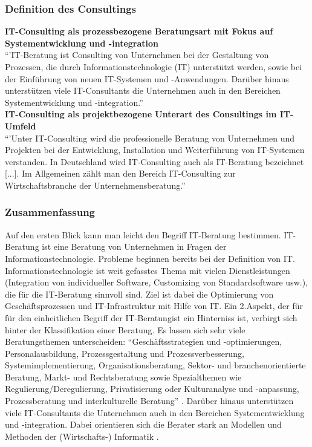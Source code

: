 		\subsubsection{Definition des Consultings}
		\textbf{IT-Consulting als prozessbezogene Beratungsart mit Fokus auf Systementwicklung und -integration}\\
			``'IT-Beratung ist Consulting von Unternehmen bei der Gestaltung von Prozessen, die durch Informationstechnologie (IT) unterstützt werden, sowie bei der Einführung von neuen IT-Systemen und -Anwendungen. Darüber hinaus unterstützen viele IT-Consultants die Unternehmen auch in den Bereichen Systementwicklung und -integration.'' \cite[208]{ReinekeBock200709}\\
			
		\textbf{ IT-Consulting als  projektbezogene Unterart des Consultings im IT-Umfeld}\\
			``'Unter IT-Consulting wird die professionelle Beratung von Unternehmen und Projekten bei der Entwicklung, Installation und Weiterführung von IT-Systemen verstanden. In Deutschland wird IT-Consulting auch als IT-Beratung bezeichnet [...]. Im Allgemeinen zählt man den Bereich IT-Consulting zur Wirtschaftsbranche der Unternehmensberatung.''
			\cite{statistaITCons}
		\subsubsection{Zusammenfassung} 
			
			
			Auf den ersten Blick kann man leicht den Begriff IT-Beratung bestimmen. IT-Beratung ist eine Beratung von Unternehmen in Fragen der Informationstechnologie. Probleme beginnen bereits bei der Definition von IT. Informationstechnologie ist weit gefasstes Thema mit vielen Dienstleistungen (Integration von individueller Software, Customizing von Standardsoftware usw.), die für die IT-Beratung sinnvoll sind. Ziel ist dabei die Optimierung von Geschäftsprozessen und IT-Infrastruktur mit Hilfe von IT.
			Ein 2.Aspekt, der für für den einheitlichen Begriff der IT-Beratungist ein Hinterniss ist, verbirgt sich hinter der Klassifikation einer Beratung. Es lassen sich sehr viele Beratungsthemen unterscheiden: %
			 ``Geschäftsstrategien und -optimierungen, Personalausbildung, Prozessgestaltung und Prozessverbesserung, Systemimplementierung, Organisationsberatung, Sektor- und branchenorientierte Beratung, Markt- und Rechtsberatung sowie Spezialthemen wie
			Regulierung/Deregulierung,  Privatisierung oder Kulturanalyse und -anpassung, Prozessberatung und  interkulturelle Beratung'' \cite[37]{ReinekeBock200709}.
			Darüber hinaus unterstützen viele IT-Consultants die Unternehmen auch in den Bereichen Systementwicklung und -integration. Dabei orientieren sich die Berater stark an Modellen und Methoden der (Wirtschafts-) Informatik \cite{InfTag2011}.
			

